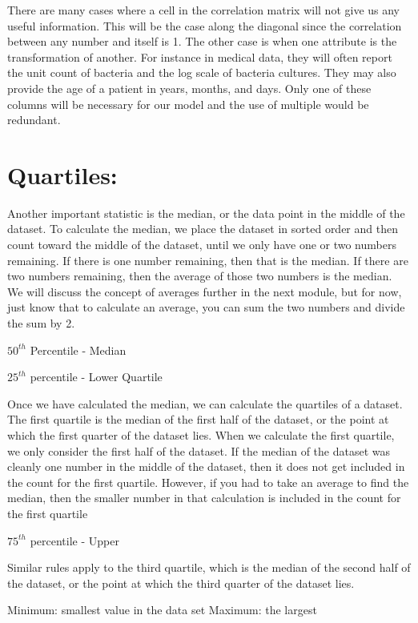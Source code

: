 There are many cases where a cell in the correlation matrix will not give us any useful information. This will be the case along the diagonal since the correlation between any number and itself is 1. The other case is when one attribute is the transformation of another. For instance in medical data, they will often report the unit count of bacteria and the log scale of bacteria cultures. They may also provide the age of a patient in years, months, and days. Only one of these columns will be necessary for our model and the use of multiple would be redundant.

\section{Quartiles:}

Another important statistic is the median, or the data point in the middle of the dataset. To calculate the median, we place the dataset in sorted order and then count toward the middle of the dataset, until we only have one or two numbers remaining. If there is one number remaining, then that is the median. If there are two numbers remaining, then the average of those two numbers is the median. We will discuss the concept of averages further in the next module, but for now, just know that to calculate an average, you can sum the two numbers and divide the sum by 2.

$50^{th}$ Percentile - Median

$25^{th}$ percentile - Lower Quartile

Once we have calculated the median, we can calculate the quartiles of a dataset. The first quartile is the median of the first half of the dataset, or the point at which the first quarter of the dataset lies. When we calculate the first quartile, we only consider the first half of the dataset. If the median of the dataset was cleanly one number in the middle of the dataset, then it does not get included in the count for the first quartile. However, if you had to take an average to find the median, then the smaller number in that calculation is included in the count for the first quartile

$75^{th}$ percentile - Upper 

Similar rules apply to the third quartile, which is the median of the second half of the dataset, or the point at which the third quarter of the dataset lies.

Minimum: smallest value in the data set
Maximum: the largest


